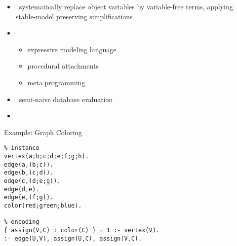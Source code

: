 \begin{frame}{\gringo}
  \begin{itemize}
  \item {} \ systematically replace object variables by variable-free terms,
    applying stable-model preserving simplifications
  \item {}
    \begin{itemize}
    \item expressive modeling language
    \item procedural attachments
    \item meta programming
    \end{itemize}
  \item {} \  semi-naive database evaluation
  \item {} \ \cite{kamsch21a}
  \end{itemize}
\end{frame}

\begin{frame}[fragile]{Example: Graph Coloring}
\begin{lstlisting}
% instance
vertex(a;b;c;d;e;f;g;h).
edge(a,(b;c)).
edge(b,(c;d)).
edge(c,(d;e;g)).
edge(d,e).
edge(e,(f;g)).
color(red;green;blue).

% encoding
{ assign(V,C) : color(C) } = 1 :- vertex(V).
:- edge(U,V), assign(U,C), assign(V,C).
\end{lstlisting}
\end{frame}

